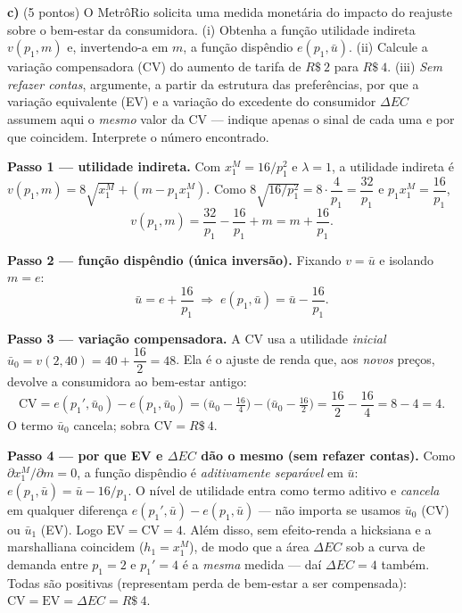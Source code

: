 \textbf{c)} (5 pontos) O MetrôRio solicita uma medida monetária do impacto do reajuste sobre o bem-estar da consumidora. (i) Obtenha a função utilidade indireta $v(p_1,m)$ e, invertendo-a em $m$, a função dispêndio $e(p_1,\bar u)$. (ii) Calcule a variação compensadora (CV) do aumento de tarifa de $R\$~2$ para $R\$~4$. (iii) \emph{Sem refazer contas}, argumente, a partir da estrutura das preferências, por que a variação equivalente (EV) e a variação do excedente do consumidor $\Delta EC$ assumem aqui o \emph{mesmo} valor da CV — indique apenas o sinal de cada uma e por que coincidem. Interprete o número encontrado.
\resolucaobox{7.6cm}
\begin{solucao}
\textbf{Passo 1 — utilidade indireta.} Com $x_1^{M}=16/p_1^{2}$ e $\lambda=1$, a utilidade indireta é $v(p_1,m)=8\sqrt{x_1^{M}}+(m-p_1 x_1^{M})$. Como $8\sqrt{16/p_1^{2}}=8\cdot\dfrac{4}{p_1}=\dfrac{32}{p_1}$ e $p_1 x_1^{M}=\dfrac{16}{p_1}$,
\[
v(p_1,m)=\frac{32}{p_1}-\frac{16}{p_1}+m=m+\frac{16}{p_1}.
\]

\textbf{Passo 2 — função dispêndio (única inversão).} Fixando $v=\bar u$ e isolando $m=e$:
\[
\bar u=e+\frac{16}{p_1}\;\Rightarrow\; e(p_1,\bar u)=\bar u-\frac{16}{p_1}.
\]

\textbf{Passo 3 — variação compensadora.} A CV usa a utilidade \emph{inicial} $\bar u_0=v(2,40)=40+\dfrac{16}{2}=48$. Ela é o ajuste de renda que, aos \emph{novos} preços, devolve a consumidora ao bem-estar antigo:
\[
\mathrm{CV}=e(p_1',\bar u_0)-e(p_1,\bar u_0)=\Big(\bar u_0-\tfrac{16}{4}\Big)-\Big(\bar u_0-\tfrac{16}{2}\Big)=\frac{16}{2}-\frac{16}{4}=8-4=4.
\]
O termo $\bar u_0$ cancela; sobra $\mathrm{CV}=R\$~4$.

\textbf{Passo 4 — por que EV e $\Delta EC$ dão o mesmo (sem refazer contas).} Como $\partial x_1^{M}/\partial m=0$, a função dispêndio é \emph{aditivamente separável} em $\bar u$: $e(p_1,\bar u)=\bar u-16/p_1$. O nível de utilidade entra como termo aditivo e \emph{cancela} em qualquer diferença $e(p_1',\bar u)-e(p_1,\bar u)$ — não importa se usamos $\bar u_0$ (CV) ou $\bar u_1$ (EV). Logo $\mathrm{EV}=\mathrm{CV}=4$. Além disso, sem efeito-renda a hicksiana e a marshalliana coincidem ($h_1=x_1^{M}$), de modo que a área $\Delta EC$ sob a curva de demanda entre $p_1=2$ e $p_1'=4$ é a \emph{mesma} medida — daí $\Delta EC=4$ também. Todas são positivas (representam perda de bem-estar a ser compensada): $\mathrm{CV}=\mathrm{EV}=\Delta EC=R\$~4$.


\end{solucao}
